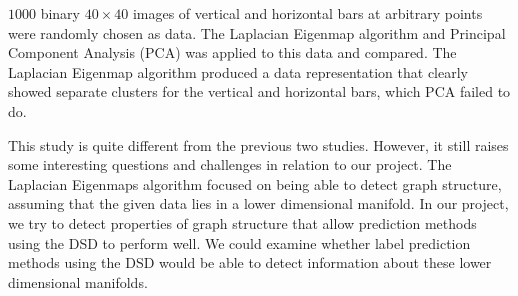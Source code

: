 $1000$ binary $40 \times 40$ images of vertical and horizontal bars at arbitrary points were
randomly chosen as data. The Laplacian Eigenmap algorithm and Principal Component Analysis (PCA) was
applied to this data and compared. The Laplacian Eigenmap algorithm produced a data representation
that clearly showed separate clusters for the vertical and horizontal bars, which PCA failed to do.

This study is quite different from the previous two studies. However, it still raises some interesting questions and challenges in relation to our project.
The Laplacian Eigenmaps algorithm focused on being able to detect graph structure, assuming that
the given data lies in a lower dimensional manifold. In our project, we try 
to detect properties of graph structure that allow prediction methods
using the DSD to perform well. We could examine whether label prediction
methods using the DSD would be able to detect information about these lower dimensional manifolds.

